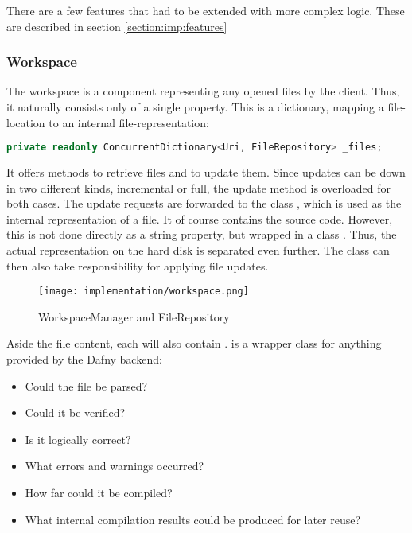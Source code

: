There are a few features that had to be extended with more complex logic.
These are described in section \ref{section:imp:features}

\subsubsection{Workspace}
The workspace is a component representing any opened files by the client.
Thus, it naturally consists only of a single property.
This is a dictionary, mapping a file-location to an internal file-representation:

\begin{lstlisting}[language=csharp, caption={Workspace Property}, captionpos=b, label={lst:workspaceproperty}]
private readonly ConcurrentDictionary<Uri, FileRepository> _files;
\end{lstlisting}

It offers methods to retrieve files and to update them.
Since updates can be down in two different kinds, incremental or full, the update method is overloaded for both cases.
The update requests are forwarded to the class , which is used as the internal representation of a file.
It of course contains the source code.
However, this is not done directly as a string property, but wrapped in a class .
Thus, the actual representation on the hard disk is separated even further.
The  class can then also take responsibility for applying file updates.\\

\begin{figure}[h]
    \centering
    \texttt{[image: implementation/workspace.png]}
    \caption{WorkspaceManager and FileRepository}
    \label{fig:worksapceAndRepo}
\end{figure}

Aside the file content, each  will also contain .
 is a wrapper class for anything provided by the Dafny backend:
\begin{itemize}
    \item Could the file be parsed?
    \item Could it be verified?
    \item Is it logically correct?
    \item What errors and warnings occurred?
    \item How far could it be compiled?
    \item What internal compilation results could be produced for later reuse?
\end{itemize}

